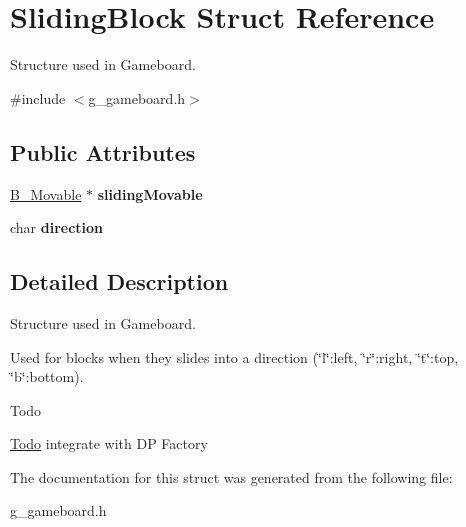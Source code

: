 \hypertarget{struct_sliding_block}{}\section{Sliding\+Block Struct Reference}
\label{struct_sliding_block}


Structure used in Gameboard.  




{\ttfamily \#include $<$g\+\_\+gameboard.\+h$>$}

\subsection*{Public Attributes}
\begin{DoxyCompactItemize}
\item 
\hypertarget{struct_sliding_block_a85d039a937b35441f54fe2a49b9e8905}{}\hyperlink{class_b___movable}{B\+\_\+\+Movable} $\ast$ {\bfseries sliding\+Movable}\label{struct_sliding_block_a85d039a937b35441f54fe2a49b9e8905}

\item 
\hypertarget{struct_sliding_block_abef74df81b435be022550c58c8b0608d}{}char {\bfseries direction}\label{struct_sliding_block_abef74df81b435be022550c58c8b0608d}

\end{DoxyCompactItemize}


\subsection{Detailed Description}
Structure used in Gameboard. 

Used for blocks when they slides into a direction (\char`\"{}l\char`\"{}\+:left, \char`\"{}r\char`\"{}\+:right, \char`\"{}t\char`\"{}\+:top, \char`\"{}b\char`\"{}\+:bottom). \begin{DoxyRefDesc}{Todo}
\item[\hyperlink{todo__todo000004}{Todo}]integrate with D\+P Factory \end{DoxyRefDesc}


The documentation for this struct was generated from the following file\+:\begin{DoxyCompactItemize}
\item 
g\+\_\+gameboard.\+h\end{DoxyCompactItemize}

